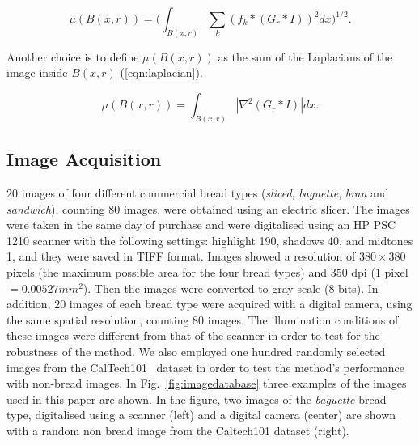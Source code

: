 \documentclass[a4paper,10pt]{article}
\begin{document}
\begin{equation}
\mu(B(x,r)) = (\int_{B(x,r)}{\sum_{k}{(f_{k} \ast (G_{r} \ast I))^{2}} dx)^{1/2}}.
\label{eqn:gradient}
\end{equation}

Another choice is to define $μ(B(x, r))$ as the sum of the Laplacians of the image inside $B(x, r)$ (\ref{eqn:laplacian}).

\begin{equation}
\mu(B(x,r)) = \int_{B(x,r)}|\nabla^2 (G_{r} \ast I)| dx.
\label{eqn:laplacian}
\end{equation}

\subsection{Image Acquisition}
$20$ images of four different commercial bread types ({\em sliced}, {\em baguette}, {\em bran} and {\em sandwich}), counting $80$ images, were obtained using an electric slicer. The images were taken in the same day of purchase and were digitalised using an HP PSC 1210 scanner with the following settings: highlight 190, shadows 40, and midtones 1, and they were saved in TIFF format. Images showed a resolution of $380 \times 380$ pixels (the maximum possible area for the four bread types) and $350$ dpi ($1$ pixel $= 0.00527 mm^{2}$). Then the images were converted to gray scale ($8$ bits). In addition, $20$ images of each bread type were acquired with a digital camera, using the same spatial resolution, counting $80$ images. The illumination conditions of these images were different from that of the scanner in order to test for the robustness of the method. We also employed one hundred randomly selected images from the CalTech101~\cite{FeiFei04} dataset in order to test the method's performance with non-bread images. In Fig.~\ref{fig:imagedatabase} three examples of the images used in this paper are shown. In the figure, two images of the {\em baguette} bread type, digitalised using a scanner (left) and a digital camera (center) are shown with a random non bread image from the Caltech101 dataset (right).
\end{document}
